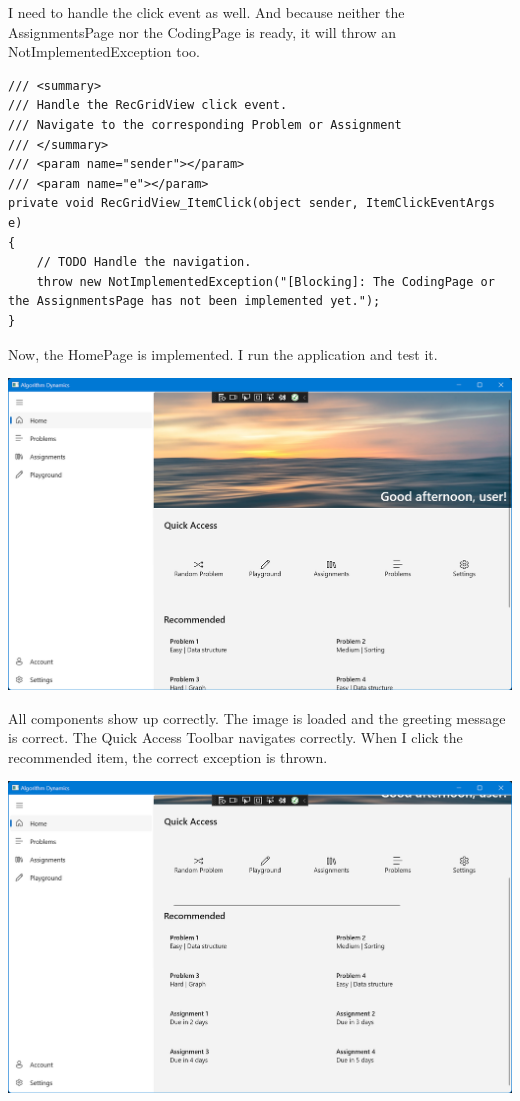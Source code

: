 \documentclass[a4paper]{report}
\begin{document}
I need to handle the click event as well. And because neither the AssignmentsPage nor the CodingPage is ready, it will throw an NotImplementedException too.

\begin{verbatim}
/// <summary>
/// Handle the RecGridView click event.
/// Navigate to the corresponding Problem or Assignment
/// </summary>
/// <param name="sender"></param>
/// <param name="e"></param>
private void RecGridView_ItemClick(object sender, ItemClickEventArgs e)
{
    // TODO Handle the navigation.
    throw new NotImplementedException("[Blocking]: The CodingPage or the AssignmentsPage has not been implemented yet.");
}
\end{verbatim}

Now, the HomePage is implemented. I run the application and test it.

\includegraphics[width=\textwidth, height=\textheight, keepaspectratio]{HomePage-Finished}

All components show up correctly. The image is loaded and the greeting message is correct. The Quick Access Toolbar navigates correctly. When I click the recommended item, the correct exception is thrown.

\includegraphics[width=\textwidth, height=\textheight, keepaspectratio]{HomePage-Finished-Scroll}
\end{document}

